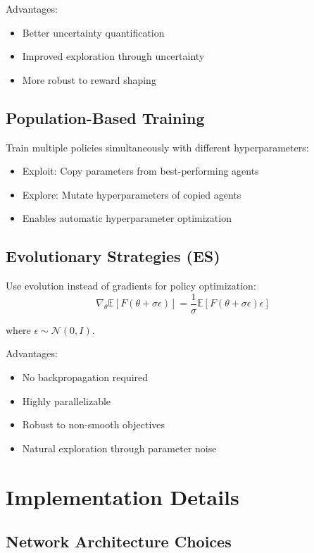 Advantages:
\begin{itemize}
    \item Better uncertainty quantification
    \item Improved exploration through uncertainty
    \item More robust to reward shaping
\end{itemize}

\subsection{Population-Based Training}

Train multiple policies simultaneously with different hyperparameters:
\begin{itemize}
    \item Exploit: Copy parameters from best-performing agents
    \item Explore: Mutate hyperparameters of copied agents
    \item Enables automatic hyperparameter optimization
\end{itemize}

\subsection{Evolutionary Strategies (ES)}

Use evolution instead of gradients for policy optimization:
\begin{equation}
\nabla_\theta \mathbb{E}[F(\theta + \sigma \epsilon)] = \frac{1}{\sigma} \mathbb{E}[F(\theta + \sigma \epsilon) \epsilon]
\end{equation}

where $\epsilon \sim \mathcal{N}(0, I)$.

Advantages:
\begin{itemize}
    \item No backpropagation required
    \item Highly parallelizable
    \item Robust to non-smooth objectives
    \item Natural exploration through parameter noise
\end{itemize}

\section{Implementation Details}

\subsection{Network Architecture Choices}

